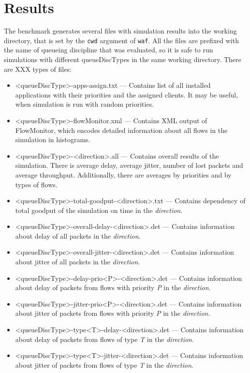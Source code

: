 \section{Results}

The benchmark generates several files with simulation results into the working directory, that is set by the \texttt{cwd} argument of \texttt{waf}. All the files are prefixed with the name of queueing discipline that was evaluated, so it is safe to run simulations with different queueDiscTypes in the same working directory. There are XX{X} types of files:

\begin{itemize}
	\item \textless queueDiscType\textgreater -apps-assign.txt --- Contains list of all installed applications with their priorities and the assigned clients. It may be useful, when simulation is run with random priorities. 
	\item \textless queueDiscType\textgreater -flowMonitor.xml --- Contains XML output of FlowMonitor, which encodes detailed information about all flows in the simulation in histograms.
	\item \textless queueDiscType\textgreater -\textless direction\textgreater.all --- Contains overall results of the simulation. There is average delay, average jitter, number of lost packets and average throughput. Additionally, there are averages by priorities and by types of flows.
	\item \textless queueDiscType\textgreater -total-goodput-\textless direction\textgreater.txt --- Contains dependency of total goodput of the simulation on time in the \emph{direction}.
	\item \textless queueDiscType\textgreater -overall-delay-\textless direction\textgreater.det --- Contains information about delay of all packets in the \emph{direction}.
	\item \textless queueDiscType\textgreater -overall-jitter-\textless direction\textgreater.det --- Contains information about jitter of all packets in the \emph{direction}.
	\item \textless queueDiscType\textgreater -delay-prio\textless P\textgreater -\textless direction\textgreater.det --- Contains information about delay of packets from flows with priority \emph{P} in the \emph{direction}.
	\item \textless queueDiscType\textgreater -jitter-prio\textless P\textgreater -\textless direction\textgreater.det --- Contains information about jitter of packets from flows with priority \emph{P} in the \emph{direction}.
	\item \textless queueDiscType\textgreater -type\textless T\textgreater -delay-\textless direction\textgreater.det --- Contains information about delay of packets from flows of type \emph{T} in the \emph{direction}.
	\item \textless queueDiscType\textgreater -type\textless T\textgreater -jitter-\textless direction\textgreater.det --- Contains information about jitter of packets from flows of type \emph{T} in the \emph{direction}.
\end{itemize}

